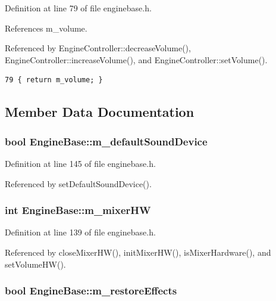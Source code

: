 Definition at line 79 of file enginebase.h.

References m\_\-volume.

Referenced by Engine\-Controller::decrease\-Volume(), Engine\-Controller::increase\-Volume(), and Engine\-Controller::set\-Volume().



\footnotesize\begin{verbatim}79 { return m_volume; }
\end{verbatim}\normalsize 


\subsection{Member Data Documentation}
\subsubsection{\setlength{\rightskip}{0pt plus 5cm}bool {\bf Engine\-Base::m\_\-default\-Sound\-Device}\hspace{0.3cm}{\tt  [protected]}}\label{classEngineBase_EngineBasep6}




Definition at line 145 of file enginebase.h.

Referenced by set\-Default\-Sound\-Device().
\subsubsection{\setlength{\rightskip}{0pt plus 5cm}int {\bf Engine\-Base::m\_\-mixer\-HW}\hspace{0.3cm}{\tt  [protected]}}\label{classEngineBase_EngineBasep0}




Definition at line 139 of file enginebase.h.

Referenced by close\-Mixer\-HW(), init\-Mixer\-HW(), is\-Mixer\-Hardware(), and set\-Volume\-HW().
\subsubsection{\setlength{\rightskip}{0pt plus 5cm}bool {\bf Engine\-Base::m\_\-restore\-Effects}\hspace{0.3cm}{\tt  [protected]}}\label{classEngineBase_EngineBasep3}




